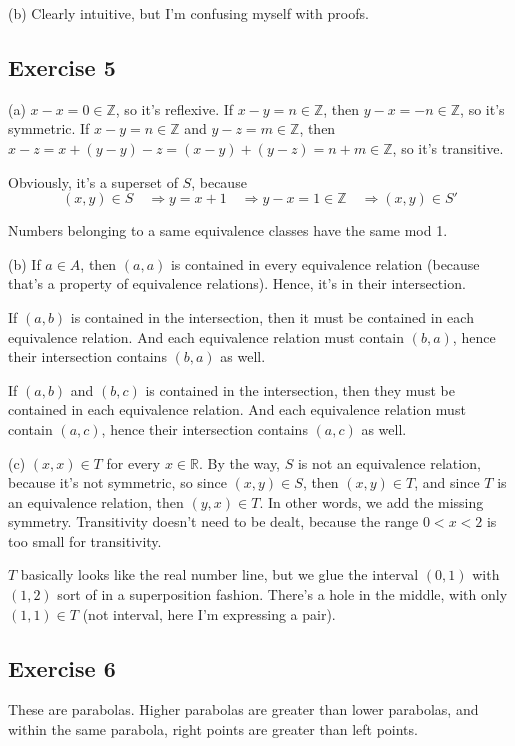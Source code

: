 \documentclass{book}
\begin{document}
\noindent
(b)
Clearly intuitive, but I'm confusing myself with proofs.

\subsection*{Exercise 5}
(a)
$x - x = 0 \in \mathbb{Z}$, so it's reflexive. If $x - y = n \in \mathbb{Z}$, then $y - x = -n \in \mathbb{Z}$, so it's symmetric. If $x - y = n \in \mathbb{Z}$ and $y - z = m \in \mathbb{Z}$, then $x - z = x + (y - y) - z = (x - y) + (y - z) = n + m \in \mathbb{Z}$, so it's transitive.

Obviously, it's a superset of $S$, because
$$(x, y) \in S \quad \Rightarrow y = x + 1 \quad \Rightarrow y - x = 1 \in \mathbb{Z} \quad \Rightarrow (x, y) \in S'$$

Numbers belonging to a same equivalence classes have the same mod 1.

\noindent
(b)
If $a \in A$, then $(a, a)$ is contained in every equivalence relation (because that's a property of equivalence relations). Hence, it's in their intersection.

If $(a, b)$ is contained in the intersection, then it must be contained in each equivalence relation. And each equivalence relation must contain $(b, a)$, hence their intersection contains $(b, a)$ as well.

If $(a, b)$ and $(b, c)$ is contained in the intersection, then they must be contained in each equivalence relation. And each equivalence relation must contain $(a, c)$, hence their intersection contains $(a, c)$ as well.

\noindent
(c)
$(x, x) \in T$ for every $x \in \mathbb{R}$. By the way, $S$ is not an equivalence relation, because it's not symmetric, so since $(x, y) \in S$, then $(x, y) \in T$, and since $T$ is an equivalence relation, then $(y, x) \in T$. In other words, we add the missing symmetry. Transitivity doesn't need to be dealt, because the range $0 < x < 2$ is too small for transitivity.

$T$ basically looks like the real number line, but we glue the interval $(0, 1)$ with $(1, 2)$ sort of in a superposition fashion. There's a hole in the middle, with only $(1, 1) \in T$ (not interval, here I'm expressing a pair).

\subsection*{Exercise 6}
These are parabolas. Higher parabolas are greater than lower parabolas, and within the same parabola, right points are greater than left points.
\end{document}
